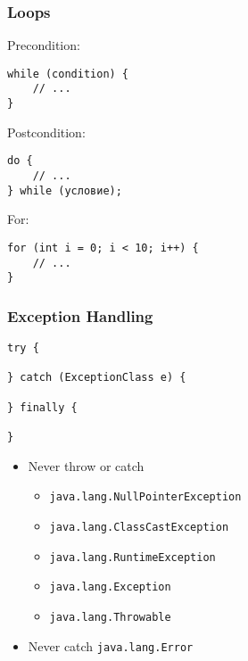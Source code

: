 \documentclass[screen]{beamer}
\begin{document}
\begin{frame}[fragile]
\frametitle{Loops}%
%
Precondition:
\begin{lstlisting}
while (condition) {
    // ...
}
\end{lstlisting}
Postcondition:
\begin{lstlisting}
do {
    // ...
} while (условие);
\end{lstlisting}
For:
\begin{lstlisting}
for (int i = 0; i < 10; i++) {
    // ...
}
\end{lstlisting}
\end{frame}

\begin{frame}[fragile]
\frametitle{Exception Handling}%
\begin{lstlisting}
try {

} catch (ExceptionClass e) {

} finally {

}
\end{lstlisting}

\begin{itemize}
	\item<2-> Never throw or catch
		\begin{itemize}[<3->]
			\item \texttt{java.lang.NullPointerException}
			\item \texttt{java.lang.ClassCastException}
			\item \texttt{java.lang.RuntimeException}
			\item \texttt{java.lang.Exception}
			\item \texttt{java.lang.Throwable}
		\end{itemize}
	\item<4-> Never catch \texttt{java.lang.Error}
\end{itemize}
\end{frame}
\end{document}

